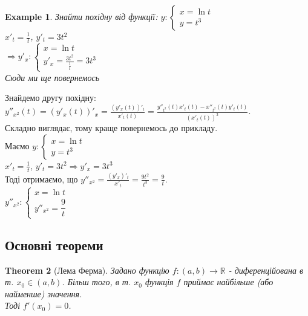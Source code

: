 \documentclass[a4paper, 14pt]{article}
\theoremstyle{theoremdd}
\newtheorem{theorem}{Theorem}[subsection]
\theoremstyle{theoremdd}
\theoremstyle{theoremdd}
\theoremstyle{theoremdd}
\newtheorem{example}[theorem]{Example}
\theoremstyle{theoremdd}
\theoremstyle{theoremdd}
\theoremstyle{theoremdd}
\theoremstyle{theoremdd}
\begin{document}
\begin{example}
Знайти похідну від функції: $y: \begin{cases} x = \ln t \\ y = t^3 \end{cases}$\\
$x'_t = \displaystyle \frac{1}{t}$,    $y'_t = 3t^2$\\
$\Rightarrow \displaystyle  y'_x: \begin{cases} x = \ln t \\ y'_x = \displaystyle \frac{3t^2}{\frac{1}{t}} = 3t^3 \end{cases}$\\
Сюди ми ще повернемось
\end{example}

Знайдемо другу похідну:\\
$\displaystyle y''_{x^2}(t) = (y'_x(t))'_x = \frac{(y'_x(t))'_t}{x'_t(t)} = \frac{y''_{t^2}(t)x'_t(t)-x''_{t^2}(t)y'_t(t)}{(x'_t(t))^3}$.
\bigskip \\
Складно виглядає, тому краще повернемось до прикладу.\\
Маємо $y: \begin{cases} x = \ln t \\ y = t^3 \end{cases}$\\
$x'_t = \displaystyle \frac{1}{t}$,    $y'_t = 3t^2 \Rightarrow y'_x = 3t^3$\\
Тоді отримаємо, що $y''_{x^2} = \displaystyle \frac{(y'_x)'_t}{x'_t} = \frac{9t^2}{t^3} = \frac{9}{t}$.\\
$y''_{x^2}: \begin{cases} x = \ln t \\ y''_{x^2} = \dfrac{9}{t} \end{cases}$

\subsection{Основні теореми}
\begin{theorem}[Лема Ферма]
Задано функцію $f: (a,b) \to \mathbb{R}$ - диференційована в т. $x_0 \in (a,b)$. Більш того, в т. $x_0$ функція $f$ приймає найбільше (або найменше) значення. \\ Тоді $f'(x_0)=0$.
\end{theorem}
\end{document}

